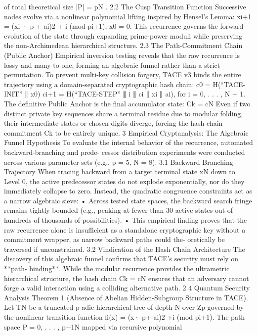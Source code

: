 of total theoretical size |P| = pN .
2.2 The Cusp Transition Function
Successive nodes evolve via a nonlinear polynomial lifting inspired by Hensel’s Lemma:
xi+1 = (xi · p + ai)2 + i (mod pi+1), x0 = 0.
This recurrence governs the forward evolution of the state through expanding prime-power
moduli while preserving the non-Archimedean hierarchical structure.
2.3 The Path-Commitment Chain (Public Anchor)
Empirical inversion testing reveals that the raw recurrence is lossy and many-to-one, forming
an algebraic funnel rather than a strict permutation. To prevent multi-key collision forgery,
TACE v3 binds the entire trajectory using a domain-separated cryptographic hash chain:
c0 = H(“TACE-INIT” ∥ x0)
ci+1 = H(“TACE-STEP” ∥ i ∥ ci ∥ xi ∥ ai), for i = 0, . . . , N − 1.
The definitive Public Anchor is the final accumulator state:
Ck = cN
Even if two distinct private key sequences share a terminal residue due to modular folding,
their intermediate states or chosen digits diverge, forcing the hash chain commitment Ck to be
entirely unique.
3 Empirical Cryptanalysis: The Algebraic Funnel Hypothesis
To evaluate the internal behavior of the recurrence, automated backward-branching and prede-
cessor distribution experiments were conducted across various parameter sets (e.g., p = 5, N =
8).
3.1 Backward Branching Trajectory
When tracing backward from a target terminal state xN down to Level 0, the active predecessor
states do not explode exponentially, nor do they immediately collapse to zero. Instead, the
quadratic congruence constraints act as a narrow algebraic sieve:
• Across tested state spaces, the backward search fringe remains tightly bounded (e.g.,
peaking at fewer than 30 active states out of hundreds of thousands of possibilities).
• This empirical finding proves that the raw recurrence alone is insufficient as a standalone
cryptographic key without a commitment wrapper, as narrow backward paths could the-
oretically be traversed if unconstrained.
3.2 Vindication of the Hash Chain Architecture
The discovery of this algebraic funnel confirms that TACE’s security must rely on **path-
binding**. While the modular recurrence provides the ultrametric hierarchical structure, the
hash chain Ck = cN ensures that an adversary cannot forge a valid interaction using a colliding
alternative path.
2
4 Quantum Security Analysis
Theorem 1 (Absence of Abelian Hidden-Subgroup Structure in TACE). Let TN be a truncated
p-adic hierarchical tree of depth N over Zp governed by the nonlinear transition function fi(x) =
(x· p+ ai)2 +i (mod pi+1). The path space P = {0, . . . , p−1}N mapped via recursive polynomial
